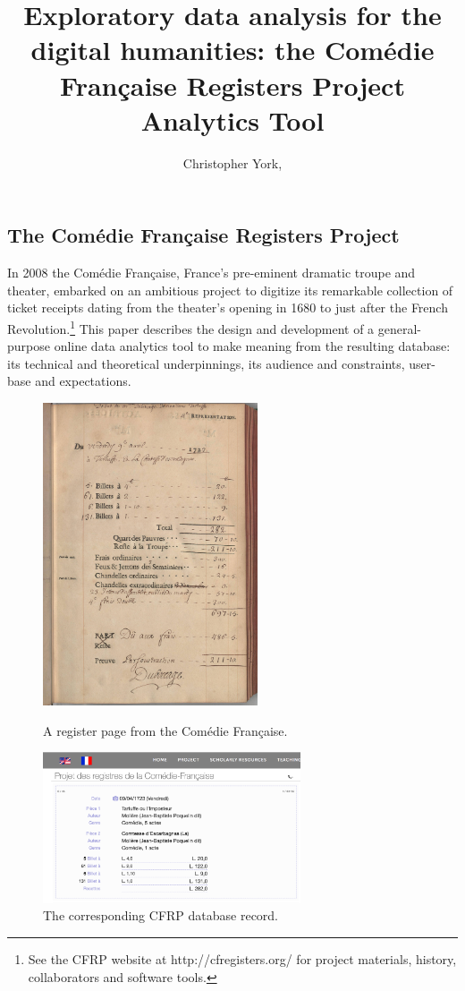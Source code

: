 \documentclass[	DIV=calc,%
							paper=a4,%
							fontsize=11pt,%
							twocolumn]{scrartcl}	 					%
\title{Exploratory data analysis for the digital humanities: the Comédie Française Registers Project Analytics Tool}					%
\author{Christopher York, }										%
\date{}																				%
\begin{document}
\maketitle
\thispagestyle{fancy} 			%

\subsection*{The Comédie Française Registers Project}

In 2008 the Comédie Française, France's pre-eminent dramatic troupe and theater, embarked on an ambitious project to digitize its remarkable collection of ticket receipts dating from the theater's opening in 1680 to just after the French Revolution.\footnote{See the CFRP website at http://cfregisters.org/ for project materials, history, collaborators and software tools.}  This paper describes the design and development of a general-purpose online data analytics tool to make meaning from the resulting database: its technical and theoretical underpinnings, its audience and constraints, user-base and expectations.

\begin{figure}
  \centering
  \includegraphics[width=2.5in]{steps/register-example.jpg}
	\caption{A register page from the Comédie Française.}
  \label{fig:register_example}
  \includegraphics[width=3in]{steps/register-example-digital.png}
	\caption{The corresponding CFRP database record.}
  \label{fig:register_example_digital}
\end{figure}
\end{document}
